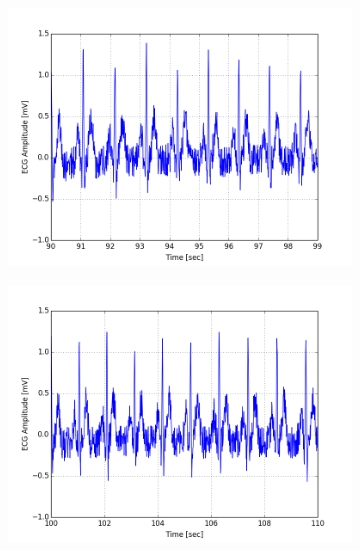 \documentclass[paper=a4, fontsize=11pt]{scrartcl}
\numberwithin{equation}{section}		%
\numberwithin{figure}{section}			%
\numberwithin{table}{section}		    %
\begin{document}
\begin{appendices}
\begin{figure}[H]
	\centering
	\begin{subfigure}[b]{0.3\textwidth}
		\includegraphics[width=\textwidth]{sim/ecg_10}
	\end{subfigure}
	\begin{subfigure}[b]{0.3\textwidth}
		\includegraphics[width=\textwidth]{sim/ecg_11}
	\end{subfigure}
	\begin{subfigure}[b]{0.3\textwidth}

\end{subfigure}
\end{figure}
\end{appendices}
\end{document}
